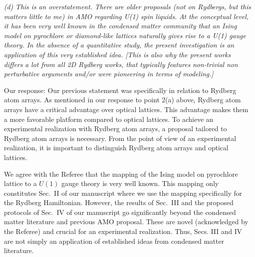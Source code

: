\documentclass[
onecolumn,
superscriptaddress,
longbibliography,
nofootinbib,
 amsmath,amssymb,
 aps,
prb
]{revtex4-2}
\newcommand{\commentJS}[1]{\textcolor{blue}{\footnotesize{JS: #1}}}
\newcommand{\response}[1]{\textcolor{Mulberry}{#1}}
\begin{document}
\begin{enumerate}
\textit{(d) This is an overstatement. There are older proposals (not on
Rydbergs, but this matters little to me) in AMO regarding U(1) spin
liquids. At the conceptual level, it has been very well known in the
condensed matter community that an Ising model on pyrochlore or
diamond-like lattices naturally gives rise to a U(1) gauge theory. In
the absence of a quantitative study, the present investigation is an
application of this very established idea. [This is also why the
present works differs a lot from all 2D Rydberg works, that typically
features non-trivial non perturbative arguments and/or were pioneering
in terms of modeling.]}

\response{Our response: Our previous statement was specifically in relation to Rydberg atom arrays. 
As mentioned in our response to point 2(a) above, Rydberg atom arrays have a critical advantage over optical lattices. 
This advantage makes them a more favorable platform compared to optical lattices. To achieve an experimental realization with Rydberg atom arrays, a proposal tailored to Rydberg atom arrays is necessary.
From the point of view of an experimental realization, it is important to distinguish Rydberg atom arrays and optical lattices.}

\response{We agree with the Referee that the mapping of the Ising model on pyrochlore lattice to a $U(1)$ gauge theory is very well known. 
This mapping only constitutes Sec.~II of our manuscript where we use the mapping specifically for the Rydberg Hamiltonian.
However, the results of Sec.~III and the proposed protocols of Sec.~IV of our manuscript go significantly beyond the condensed matter literature and previous AMO proposal.
These are novel (acknowledged by the Referee) and crucial for an experimental realization.
Thus, Secs. III and IV are not simply an application of established ideas from condensed matter literature.
}


\end{enumerate}
\end{document}
